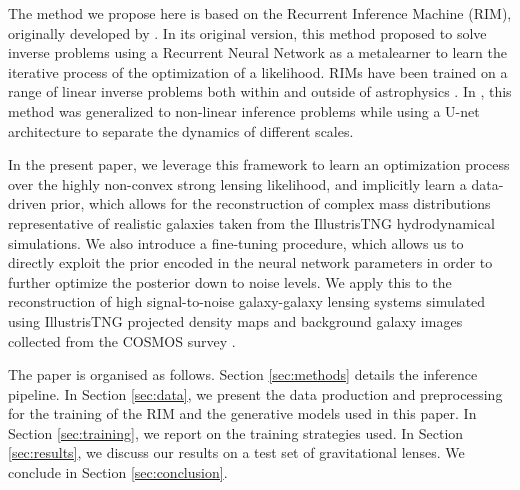 The method we propose here is based on the Recurrent Inference Machine (RIM), originally developed by \citet{Putzky2017}. In its original version, this method proposed to solve inverse problems using a Recurrent Neural Network as a metalearner to learn the iterative process of the optimization of a likelihood. RIMs have been trained on a range of linear inverse problems both within and outside of astrophysics \citep{Lonning2019}. In \cite{Modi2021}, this method was generalized to non-linear inference problems while using a U-net architecture \citep{Ronneberger2015} to separate the dynamics of different scales. 

In the present paper, we leverage this framework to learn an optimization process over the highly non-convex strong lensing likelihood, and implicitly learn a data-driven prior, which allows for the reconstruction of complex mass distributions representative of realistic galaxies taken from the IllustrisTNG \citep{Nelson2018} hydrodynamical simulations.
We also introduce a fine-tuning procedure, which allows us to directly exploit the prior encoded in the neural network parameters in order to further optimize the posterior down to noise levels. We apply this to the reconstruction of high signal-to-noise galaxy-galaxy lensing systems simulated using IllustrisTNG \citep{Nelson2018} projected density maps and background galaxy images collected from the COSMOS survey \citep{Koekemoer2007,Scoville2007}.

The paper is organised as follows. Section \ref{sec:methods} details 
the inference pipeline. In Section \ref{sec:data}, we present the data production and preprocessing for the training of the RIM and the generative models used in this paper. In Section \ref{sec:training}, 
we report on the training strategies used. 
In Section \ref{sec:results},
we discuss our results on a test set of gravitational lenses. We conclude in Section 
\ref{sec:conclusion}.



